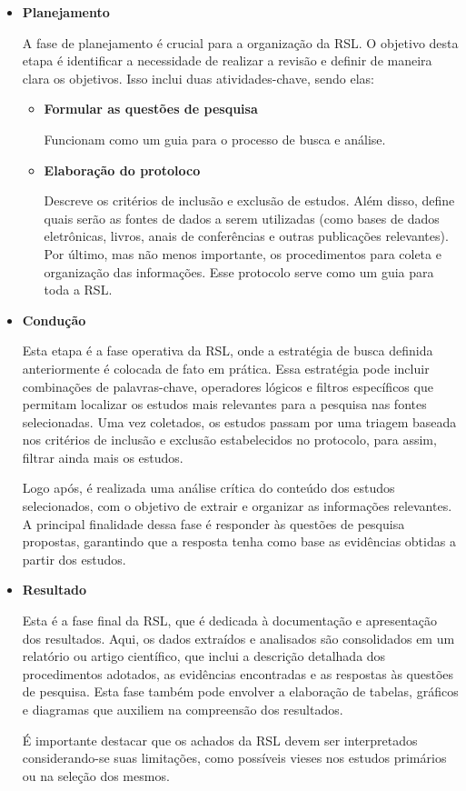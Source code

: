 \begin{itemize}
	\item \textbf{Planejamento}

A fase de planejamento é crucial para a organização da RSL. O objetivo desta etapa é identificar a necessidade de realizar a revisão e definir de maneira clara os objetivos. Isso inclui duas atividades-chave, sendo elas:

\begin{itemize}
	\item \textbf{Formular as questões de pesquisa}
	
		Funcionam como um guia para o processo de busca e análise.
	
	\item \textbf{Elaboração do protoloco}
	
		 Descreve os critérios de inclusão e exclusão de estudos. Além disso, define quais serão as fontes de dados a serem utilizadas (como bases de dados eletrônicas, livros, anais de conferências e outras publicações relevantes). Por último, mas não menos importante, os procedimentos para coleta e organização das informações. Esse protocolo serve como um guia para toda a RSL.
\end{itemize}

\item \textbf{Condução}

Esta etapa é a fase operativa da RSL, onde a estratégia de busca definida anteriormente é colocada de fato em prática. Essa estratégia pode incluir combinações de palavras-chave, operadores lógicos e filtros específicos que permitam localizar os estudos mais relevantes para a pesquisa nas fontes selecionadas. Uma vez coletados, os estudos passam por uma triagem baseada nos critérios de inclusão e exclusão estabelecidos no protocolo, para assim, filtrar ainda mais os estudos.

Logo após, é realizada uma análise crítica do conteúdo dos estudos selecionados, com o objetivo de extrair e organizar as informações relevantes. A principal finalidade dessa fase é responder às questões de pesquisa propostas, garantindo que a resposta tenha como base as evidências obtidas a partir dos estudos.


\item \textbf{Resultado}

Esta é a fase final da RSL, que é dedicada à documentação e apresentação dos resultados. Aqui, os dados extraídos e analisados são consolidados em um relatório ou artigo científico, que inclui a descrição detalhada dos procedimentos adotados, as evidências encontradas e as respostas às questões de pesquisa. Esta fase também pode envolver a elaboração de tabelas, gráficos e diagramas que auxiliem na compreensão dos resultados.

É importante destacar que os achados da RSL devem ser interpretados considerando-se suas limitações, como possíveis vieses nos estudos primários ou na seleção dos mesmos.

\end{itemize}


